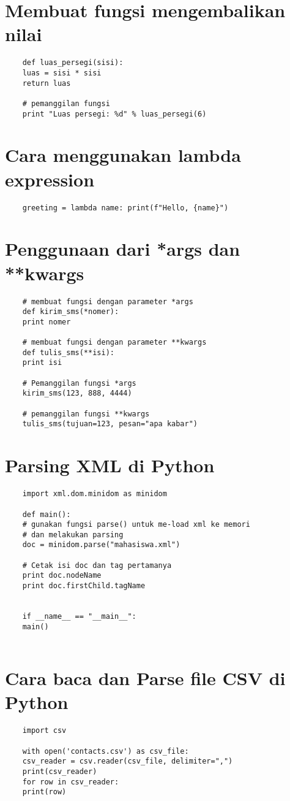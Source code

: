 \documentclass{article}
\begin{document}
\section{Membuat fungsi mengembalikan nilai}
\begin{lstlisting}
	def luas_persegi(sisi):
	luas = sisi * sisi
	return luas
	
	# pemanggilan fungsi
	print "Luas persegi: %d" % luas_persegi(6)
\end{lstlisting}

\section{Cara menggunakan lambda expression}
\begin{lstlisting}
	greeting = lambda name: print(f"Hello, {name}") 
\end{lstlisting}

\section{Penggunaan dari *args dan **kwargs}
\begin{lstlisting}
	# membuat fungsi dengan parameter *args
	def kirim_sms(*nomer):
	print nomer
	
	# membuat fungsi dengan parameter **kwargs
	def tulis_sms(**isi):
	print isi
	
	# Pemanggilan fungsi *args
	kirim_sms(123, 888, 4444)
	
	# pemanggilan fungsi **kwargs
	tulis_sms(tujuan=123, pesan="apa kabar")
\end{lstlisting}

\section{Parsing XML di Python}
\begin{lstlisting}
	import xml.dom.minidom as minidom
	
	def main():
	# gunakan fungsi parse() untuk me-load xml ke memori 
	# dan melakukan parsing
	doc = minidom.parse("mahasiswa.xml")
	
	# Cetak isi doc dan tag pertamanya
	print doc.nodeName
	print doc.firstChild.tagName
	
	
	if __name__ == "__main__":
	main()
	
\end{lstlisting}

\section{Cara baca dan Parse file CSV di Python}
\begin{lstlisting}
	import csv
	
	with open('contacts.csv') as csv_file:
	csv_reader = csv.reader(csv_file, delimiter=",")
	print(csv_reader)
	for row in csv_reader:
	print(row)
\end{lstlisting}
\end{document}
